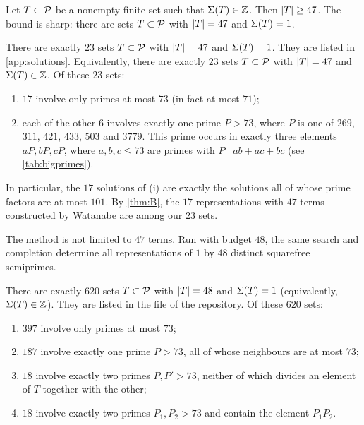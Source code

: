 \documentclass[11pt]{article}
\begin{document}
\begin{maintheorem}\label{thm:A}
Let $T\subset\mathcal{P}$ be a nonempty finite set such that $\Sigma(T)\in\mathbb{Z}$. Then $\lvert T\rvert\ge 47$.
The bound is sharp: there are sets $T\subset\mathcal{P}$ with $\lvert T\rvert=47$ and $\Sigma(T)=1$.
\end{maintheorem}

\begin{maintheorem}\label{thm:B}
There are exactly $23$ sets $T\subset\mathcal{P}$ with $\lvert T\rvert=47$ and $\Sigma(T)=1$. They are listed in \cref{app:solutions}.
Equivalently, there are exactly $23$ sets $T\subset\mathcal{P}$ with $\lvert T\rvert=47$ and $\Sigma(T)\in\mathbb{Z}$.
Of these $23$ sets:
\begin{enumerate}[label=\textup{(\roman*)}]
\item $17$ involve only primes at most $73$ (in fact at most $71$);
\item each of the other $6$ involves exactly one prime $P>73$, where $P$ is one of $269$, $311$, $421$, $433$, $503$ and $3779$. This prime occurs in exactly three elements $aP,bP,cP$, where $a,b,c\le 73$ are primes with $P\mid ab+ac+bc$ (see \cref{tab:bigprimes}).
\end{enumerate}
\end{maintheorem}

In particular, the $17$ solutions of (i) are exactly the solutions all of whose prime factors are at most $101$.
By \cref{thm:B}, the $17$ representations with $47$ terms constructed by Watanabe \cite{Watanabe2020} are among our $23$ sets.

The method is not limited to $47$ terms. Run with budget $48$, the same search and completion determine all representations of $1$ by $48$ distinct squarefree semiprimes.

\begin{maintheorem}\label{thm:C}
There are exactly $620$ sets $T\subset\mathcal{P}$ with $\lvert T\rvert=48$ and $\Sigma(T)=1$ (equivalently, $\Sigma(T)\in\mathbb{Z}$). They are listed in the file  of the repository. Of these $620$ sets:
\begin{enumerate}[label=\textup{(\roman*)}]
\item $397$ involve only primes at most $73$;
\item $187$ involve exactly one prime $P>73$, all of whose neighbours are at most $73$;
\item $18$ involve exactly two primes $P,P'>73$, neither of which divides an element of $T$ together with the other;
\item $18$ involve exactly two primes $P_1,P_2>73$ and contain the element $P_1P_2$.
\end{enumerate}
\end{maintheorem}
\end{document}
